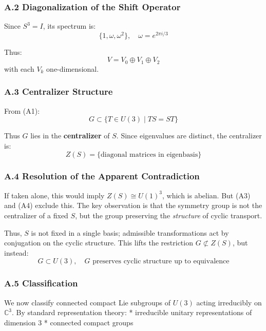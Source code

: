 \documentclass[
]{article}
\begin{document}
\hypertarget{a.2-diagonalization-of-the-shift-operator}{%
\subsubsection{A.2 Diagonalization of the Shift
Operator}\label{a.2-diagonalization-of-the-shift-operator}}

Since \(S^3 = I\), its spectrum is:
\[\{1, \omega, \omega^2\}, \quad \omega = e^{2\pi i/3}\]

Thus: \[V = V_0 \oplus V_1 \oplus V_2\] with each \(V_k\)
one-dimensional.

\hypertarget{a.3-centralizer-structure}{%
\subsubsection{A.3 Centralizer
Structure}\label{a.3-centralizer-structure}}

From (A1): \[G \subset \{T \in U(3) \mid TS = ST\}\]

Thus \(G\) lies in the \textbf{centralizer} of \(S\). Since eigenvalues
are distinct, the centralizer is:
\[Z(S) = \{ \text{diagonal matrices in eigenbasis} \}\]

\hypertarget{a.4-resolution-of-the-apparent-contradiction}{%
\subsubsection{A.4 Resolution of the Apparent
Contradiction}\label{a.4-resolution-of-the-apparent-contradiction}}

If taken alone, this would imply \(Z(S) \cong U(1)^3\), which is
abelian. But (A3) and (A4) exclude this. The key observation is that the
symmetry group is not the centralizer of a fixed \(S\), but the group
preserving the \emph{structure} of cyclic transport.

Thus, \(S\) is not fixed in a single basis; admissible transformations
act by conjugation on the cyclic structure. This lifts the restriction
\(G \not\subset Z(S)\), but instead:
\[G \subset U(3), \quad G \text{ preserves cyclic structure up to equivalence}\]

\hypertarget{a.5-classification}{%
\subsubsection{A.5 Classification}\label{a.5-classification}}

We now classify connected compact Lie subgroups of \(U(3)\) acting
irreducibly on \(\mathbb{C}^3\). By standard representation theory: *
irreducible unitary representations of dimension 3 * connected compact
groups
\end{document}
